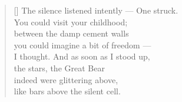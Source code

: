 \documentclass[a4paper,12pt,twoside,final]{book}
\begin{document}
\settowidth{\versewidth}{The silence listened intently --- One struck.}

\begin{verse}[\versewidth]
  The silence listened intently --- One struck. \\
  You could visit your childhood; \\
  between the damp cement walls \\
  you could imagine a bit of freedom --- \\
  I thought. And as soon as I stood up, \\
  the stars, the Great Bear \\
  indeed were glittering above, \\
  like bars above the silent cell.
\end{verse}


\newpage

\settowidth{\versewidth}{gondoltam. S hát hát amint fölállok}
\end{document}
